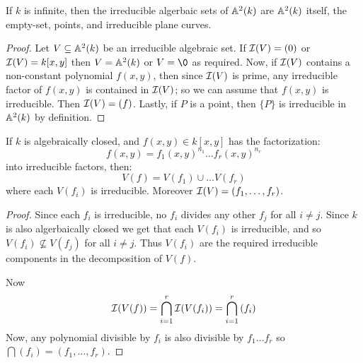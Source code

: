 \begin{corollary}
  If $k$ is infinite, then the irreducible algerbaic sets of $\mathbb{A}^2(k)$
  are $\mathbb{A}^2(k)$ itself, the empty-set, points, and irreducible
  plane curves.
\end{corollary}
\begin{proof}
  Let $V \subseteq \mathbb{A}^2(k)$ be an irreducible algebraic set. If
  $\mathcal{I}(V)=(0)$ or $\mathcal{I}(V)=k[x,y]$ then $V=\mathbb{A}^2(k)$ or $V=\0$ as
  required. Now, if $\mathcal{I}(V)$ contains a non-constant polynomial
  $f(x,y)$, then since $\mathcal{I}(V)$ is prime, any irreducible factor of
  $f(x,y)$ is contained in $\mathcal{I}(V)$; so we can assume that $f(x,y)$ is
  irreducible. Then $\mathcal{I}(V)=(f)$. Lastly, if $P$ is a point, then
  $\{P\}$ is irreducible in $\mathbb{A}^2(k)$ by definition.
\end{proof}
\begin{corollary}
  If $k$ is algebraically closed, and $f(x,y) \in k[x,y]$ has the
  factorization:
  \begin{equation*}
    f(x,y)=f_1(x,y)^{n_1} \dots f_r(x,y)^{n_r}
  \end{equation*}
  into irreducible factors, then:
  \begin{equation*}
    V(f)=V(f_1) \cup \dots V(f_r)
  \end{equation*}
  where each $V(f_i)$ is irreducible. Moreover $\mathcal{I}(V)=(f_1, \dots,
  f_r)$.
\end{corollary}
\begin{proof}
  Since each $f_i$ is irreducible, no $f_i$ divides any other $f_j$
  for all $i \neq j$. Since $k$ is also algerbaically closed we get
  that each $V(f_i)$ is irreducible, and so $V(f_i) \not\subseteq V(f_j)$
  for all $i \neq j$. Thus $V(f_i)$ are the required irreducible
  components in the decomposition of $V(f)$.

  Now
  \begin{equation*}
    \mathcal{I}(V(f))=\bigcap_{i=1}^r{\mathcal{I}(V(f_i))}=\bigcap_{i=1}^r{(f_i)}
  \end{equation*}
  Now, any polynomial divisible by $f_i$ is also divisible by $f_1
  \dots f_r$ so $\bigcap{(f_i)}=(f_1, \dots, f_r)$.
\end{proof}

